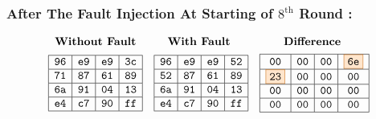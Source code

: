 \subsubsection{After The Fault Injection At Starting of $8^{\text{th}}$ Round :}
\[
\begin{array}{ccc}
\textbf{Without Fault} & \textbf{With Fault } & \textbf{Difference } \\[1ex]
\begin{array}{|c|c|c|c|}
\hline
\texttt{96} & \texttt{e9} & \texttt{e9} & \texttt{3c} \\
\hline
\texttt{71} & \texttt{87} & \texttt{61} & \texttt{89} \\
\hline
\texttt{6a} & \texttt{91} & \texttt{04} & \texttt{13} \\
\hline
\texttt{e4} & \texttt{c7} & \texttt{90} & \texttt{ff} \\
\hline
\end{array} 
&

\begin{array}{|c|c|c|c|}
    \hline
    \texttt{96} & \texttt{e9} & \texttt{e9} & \texttt{52} \\
    \hline
    \texttt{52} & \texttt{87} & \texttt{61} & \texttt{89} \\
    \hline
    \texttt{6a} & \texttt{91} & \texttt{04} & \texttt{13} \\
    \hline
    \texttt{e4} & \texttt{c7} & \texttt{90} & \texttt{ff} \\
    \hline
    \end{array}

    &

\begin{array}{|c|c|c|c|}
    \hline
    \texttt{00} & \texttt{00} & \texttt{00} & \fcolorbox{orange!80!black}{orange!20}{\texttt{6e}} \\
    \hline
    \fcolorbox{orange!80!black}{orange!20}{\texttt{23}} & \texttt{00} & \texttt{00} & \texttt{00} \\
    \hline
    \texttt{00} & \texttt{00} & \texttt{00} & \texttt{00} \\
    \hline
    \texttt{00} & \texttt{00} & \texttt{00} & \texttt{00} \\
    \hline
    \end{array}
\end{array}
\]

